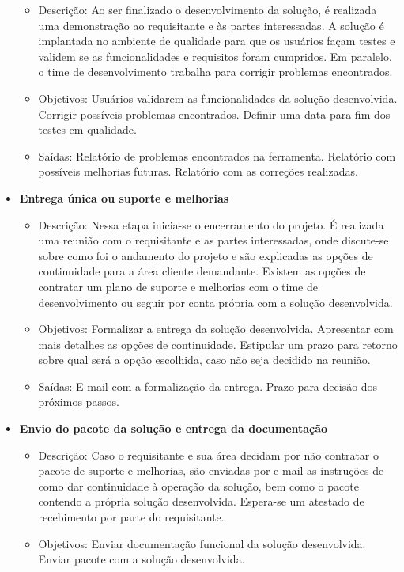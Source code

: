 \begin{itemize}
		\begin{itemize}
			\item Descrição: Ao ser finalizado o desenvolvimento da solução, é realizada uma demonstração ao requisitante e às partes interessadas.
			A solução é implantada no ambiente de qualidade para que os usuários façam testes e validem se as funcionalidades e requisitos foram cumpridos.
			Em paralelo, o time de desenvolvimento trabalha para corrigir problemas encontrados.
			\item Objetivos: Usuários validarem as funcionalidades da solução desenvolvida. Corrigir possíveis problemas encontrados. Definir uma data para fim dos testes em qualidade. 
			\item Saídas: Relatório de problemas encontrados na ferramenta. Relatório com possíveis melhorias futuras. Relatório com as correções realizadas.
		\end{itemize}
		\item \textbf{Entrega única ou suporte e melhorias}
		\begin{itemize}
			\item Descrição: Nessa etapa inicia-se o encerramento do projeto. É realizada uma reunião com o requisitante e as partes interessadas, onde discute-se
			sobre como foi o andamento do projeto e são explicadas as opções de continuidade para a área cliente demandante. Existem as opções de contratar 
			um plano de suporte e melhorias com o time de desenvolvimento ou seguir por conta própria com a solução desenvolvida. 
			\item Objetivos: Formalizar a entrega da solução desenvolvida. Apresentar com mais detalhes as opções de continuidade. Estipular um prazo para retorno sobre qual será a opção escolhida, caso não seja decidido na reunião.
			\item Saídas: E-mail com a formalização da entrega. Prazo para decisão dos próximos passos.
		\end{itemize}
		\item \textbf{Envio do pacote da solução e entrega da documentação}
		\begin{itemize}
			\item Descrição: Caso o requisitante e sua área decidam por não contratar o pacote de suporte e melhorias, são enviadas por e-mail as instruções de como dar continuidade à operação da solução, bem como o pacote contendo a própria solução desenvolvida. Espera-se um atestado de recebimento por parte do requisitante.
			\item Objetivos: Enviar documentação funcional da solução desenvolvida. Enviar pacote com a solução desenvolvida.

\end{itemize}
\end{itemize}
